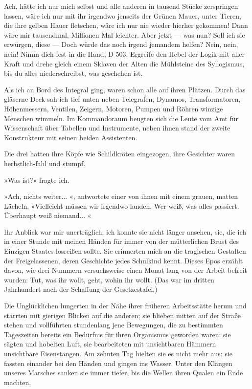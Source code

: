 Ach, hätte ich nur mich selbst und alle anderen in tausend Stücke
zerspringen lassen, wäre ich nur mit ihr irgendwo jenseits der
Grünen Mauer, unter Tieren, die ihre gelben Hauer fletschen, wäre
ich nur nie wieder hierher gekommen! Dann wäre mir tausendmal,
Millionen Mal leichter. Aber jetzt — was nun? Soll ich sie
erwürgen, diese — Doch würde das noch irgend jemandem helfen? Nein,
nein, nein! Nimm dich fest in die Hand, D-503. Ergreife den Hebel
der Logik mit aller Kraft und drehe gleich einem Sklaven der Alten
die Mühlsteine des Syllogismus, bis du alles niederschreibst, was
geschehen ist.

Als ich an Bord des Integral ging, waren schon alle auf ihren
Plätzen. Durch das gläserne Deck sah ich tief unten neben
Telegrafen, Dynamos, Transformatoren, Höhenmessern, Ventilen,
Zeigern, Motoren, Pumpen und Röhren winzige Menschen wimmeln. Im
Kommandoraum beugten sich die Leute vom Amt für Wissenschaft über
Tabellen und Instrumente, neben ihnen stand der zweite Konstrukteur
mit seinen beiden Assistenten.

Die drei hatten ihre Köpfe wie Schildkröten eingezogen, ihre
Gesichter waren herbstlich-fahl und stumpf.

»Was ist?« fragte ich.

»Ach, nichts weiter... «, antwortete einer von ihnen mit einem
grauen, matten Lächeln. »Vielleicht müssen wir irgendwo landen. Wer
weiß, was alles passiert. Überhaupt weiß niemand... «

Ihr Anblick war mir unerträglich; ich konnte sie nicht länger
ansehen, sie, die ich in einer Stunde mit meinen Händen für immer
von der mütterlichen Brust des Einzigen Staates losreißen sollte.
Sie erinnerten mich an die tragischen Gestalten der Freigelassenen,
deren Geschichte jedes Schulkind kennt. Dieses Epos erzählt davon,
wie drei Nummern versuchsweise einen Monat lang von der Arbeit
befreit wurden: Tut, was ihr wollt, geht, wohin ihr wollt. (Das war
im dritten Jahrhundert nach der Schaffung der Gesetzestafel.)

Die Unglücklichen lungerten in der Nähe ihrer früheren
Arbeitsstätte herum und starrten mit gierigen Blicken auf die
anderen; sie blieben mitten auf der Straße stehen und vollführten
stundenlang jene Bewegungen, die zu bestimmten Tageszeiten bereits
ein Bedürfnis für ihren Organismus geworden waren: sie sägten und
hobelten Luft, sie bearbeiteten mit unsichtbaren Hämmern
unsichtbare Eisenstangen. Am zehnten Tag hielten sie es nicht mehr
aus: sie fassten einander bei den Händen und gingen ins Wasser.
Unter den Klängen unseres Marsches sanken sie immer tiefer, bis die
Wellen ihren Qualen ein Ende machten.

